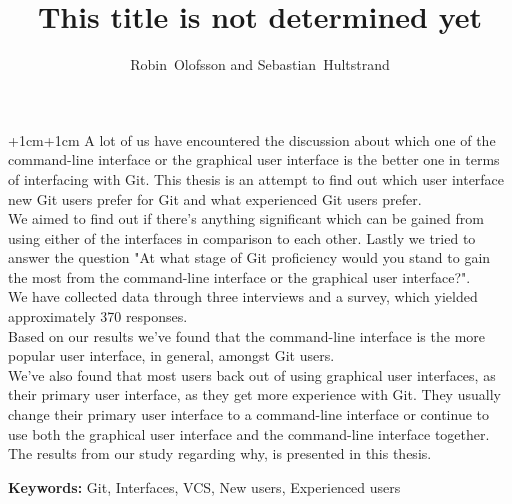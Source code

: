 \documentclass[a4paper,oneside]{bth} %
\begin{document}
		\abstract
		\begin{changemargin}{+1cm}{+1cm}
			\noindent
				A lot of us have encountered the discussion about which one of the command-line interface or the graphical user interface is the better one in terms of interfacing with Git.
				This thesis is an attempt to find out which user interface new Git users prefer for Git and what experienced Git users prefer.\\
				We aimed to find out if there's anything significant which can be gained from using either of the interfaces in comparison to each other. Lastly we tried to answer the question "At what stage of Git proficiency would you stand to gain the most from the command-line interface or the graphical user interface?".\\
				We have collected data through three interviews and a survey, which yielded approximately 370 responses.\\
				Based on our results we've found that the command-line interface is the more popular user interface, in general, amongst Git users.
				\\We've also found that most users back out of using graphical user interfaces, as their primary user interface, as they get more experience with Git. They usually change their primary user interface to a command-line interface or continue to use both the graphical user interface and the command-line interface together.
				The results from our study regarding why, is presented in this thesis.
				

			\par\vspace {1cm}
			\noindent
			\textbf{Keywords:} Git, Interfaces, VCS, New users, Experienced users
		\end{changemargin}

		\tableofcontents 
		\listoffigures %
		
		\cleardoublepage
		\pagestyle{headings}
		
		\title{This title is not determined yet}
		\author{Robin~Olofsson and Sebastian~Hultstrand}
		
\end{document}
